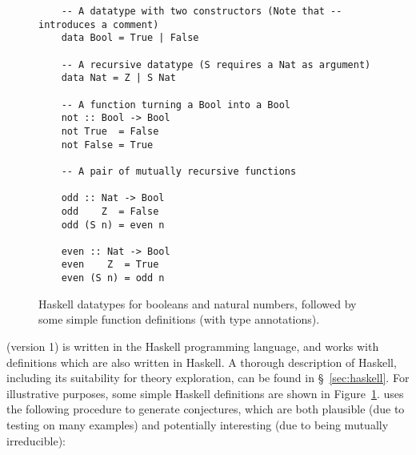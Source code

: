 \begin{figure}
  \centering
  \begin{verbatim}
    -- A datatype with two constructors (Note that -- introduces a comment)
    data Bool = True | False

    -- A recursive datatype (S requires a Nat as argument)
    data Nat = Z | S Nat

    -- A function turning a Bool into a Bool
    not :: Bool -> Bool
    not True  = False
    not False = True

    -- A pair of mutually recursive functions

    odd :: Nat -> Bool
    odd    Z  = False
    odd (S n) = even n

    even :: Nat -> Bool
    even    Z  = True
    even (S n) = odd n
  \end{verbatim}
  \caption{Haskell datatypes for booleans and natural numbers, followed by some
    simple function definitions (with type annotations).}
  \label{fig:haskellteexample}
\end{figure}

\quickspec{} (version 1) is written in the Haskell programming language, and
works with definitions which are also written in Haskell. A thorough description
of Haskell, including its suitability for theory exploration, can be found
in \S~\ref{sec:haskell}. For illustrative purposes, some simple Haskell
definitions are shown in Figure~\ref{fig:haskellteexample}. \quickspec{} uses
the following procedure to generate conjectures, which are both plausible (due
to testing on many examples) and potentially interesting (due to being mutually irreducible):

